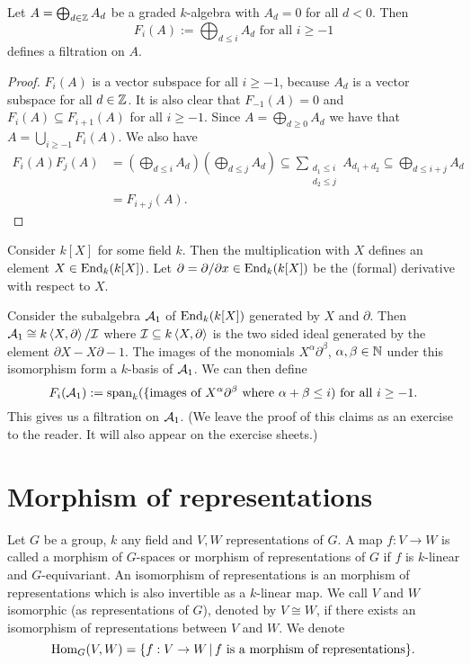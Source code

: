 \begin{lem}
 Let $A = \bigoplus_{d \in \mathbb{Z}} A_d$ be a graded $k$-algebra with $A_d = 0$ for all $d < 0$. Then
 \[
  F_i(A) := \bigoplus_{d \leq i} A_d \text{ for all } i \geq -1
 \]
 defines a filtration on $A$.
\end{lem}
\begin{proof}
 $F_i(A)$ is a vector subspace for all $i \geq -1$, because $A_d$ is a vector subspace for all $d \in \mathbb{Z}$. It is also clear that $F_{-1}(A) = 0$ and $F_i(A) \subseteq F_{i+1}(A)$ for all $i \geq -1$. Since $A = \bigoplus_{d \geq 0} A_d$ we have that $A = \bigcup_{i \geq -1} F_i(A)$. We also have
 \begin{align*}
  F_i(A) F_j(A)
  &= \left( \bigoplus_{d \leq i} A_d \right) \left( \bigoplus_{d \leq j} A_d \right)
  \subseteq \sum_{\substack{d_1 \leq i \\ d_2 \leq j}} A_{d_1 + d_2}
  \subseteq \bigoplus_{d \leq i+j} A_d \\
  &= F_{i+j}(A).
 \end{align*}
\end{proof}


\begin{expl}
 Consider $k[X]$ for some field $k$. Then the multiplication with $X$ defines an element $X \in \operatorname{End}_k(k[X])$. Let $\partial = \partial/\partial x \in \operatorname{End}_k(k[X])$ be the (formal) derivative with respect to $X$.
 
 Consider the subalgebra $\mathcal{A}_1$ of $\operatorname{End}_k(k[X])$ generated by $X$ and $\partial$. Then $\mathcal{A}_1 \cong k\left\langle X,\partial \right\rangle/\mathcal{I}$ where $\mathcal{I} \subseteq k \left\langle X,\partial \right\rangle$ is the two sided ideal generated by the element $\partial X - X \partial - 1$. The images of the monomials $X^\alpha \partial^\beta$, $\alpha, \beta \in \mathbb{N}$ under this isomorphism form a $k$-basis of $\mathcal{A}_1$. We can then define
 \[
  F_i(\mathcal{A}_1) := \operatorname{span}_k(\{\text{images of $X^\alpha \partial^\beta$ where $\alpha+\beta \leq i$}) \text{ for all } i \geq -1.
 \]
 This gives us a filtration on $\mathcal{A}_1$. (We leave the proof of this claims as an exercise to the reader. It will also appear on the exercise sheets.)
\end{expl}


\section{Morphism of representations}


\begin{defi}
Let $G$ be a group, $k$ any field and $V,W$ representations of $G$. A map $f : V \to W$ is called a morphism of $G$-spaces or morphism  of representations of $G$ if $f$ is $k$-linear and $G$-equivariant. An isomorphism of representations is an morphism of representations which is also invertible as a $k$-linear map. We call $V$ and $W$ isomorphic (as representations of $G$), denoted by $V \cong W$, if there exists an isomorphism of representations between $V$ and $W$. We denote
\[
 \operatorname{Hom}_G(V,W) = \{f : V \to W \,|\, f \text{ is a morphism of representations}\}.
\]
\end{defi}


